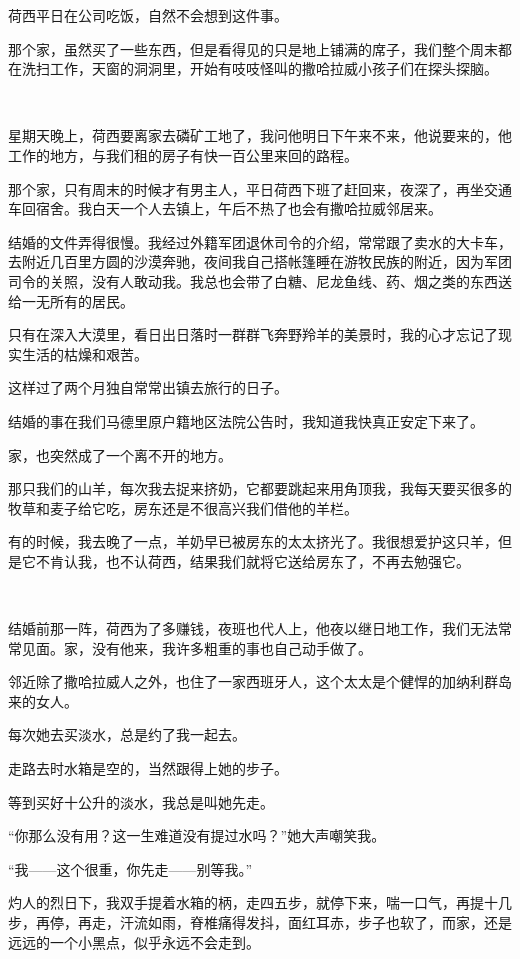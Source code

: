 \par 荷西平日在公司吃饭，自然不会想到这件事。
\par 那个家，虽然买了一些东西，但是看得见的只是地上铺满的席子，我们整个周末都在洗扫工作，天窗的洞洞里，开始有吱吱怪叫的撒哈拉威小孩子们在探头探脑。
\par  
\par 星期天晚上，荷西要离家去磷矿工地了，我问他明日下午来不来，他说要来的，他工作的地方，与我们租的房子有快一百公里来回的路程。
\par 那个家，只有周末的时候才有男主人，平日荷西下班了赶回来，夜深了，再坐交通车回宿舍。我白天一个人去镇上，午后不热了也会有撒哈拉威邻居来。
\par 结婚的文件弄得很慢。我经过外籍军团退休司令的介绍，常常跟了卖水的大卡车，去附近几百里方圆的沙漠奔驰，夜间我自己搭帐篷睡在游牧民族的附近，因为军团司令的关照，没有人敢动我。我总也会带了白糖、尼龙鱼线、药、烟之类的东西送给一无所有的居民。
\par 只有在深入大漠里，看日出日落时一群群飞奔野羚羊的美景时，我的心才忘记了现实生活的枯燥和艰苦。
\par 这样过了两个月独自常常出镇去旅行的日子。
\par 结婚的事在我们马德里原户籍地区法院公告时，我知道我快真正安定下来了。
\par 家，也突然成了一个离不开的地方。
\par 那只我们的山羊，每次我去捉来挤奶，它都要跳起来用角顶我，我每天要买很多的牧草和麦子给它吃，房东还是不很高兴我们借他的羊栏。
\par 有的时候，我去晚了一点，羊奶早已被房东的太太挤光了。我很想爱护这只羊，但是它不肯认我，也不认荷西，结果我们就将它送给房东了，不再去勉强它。
\par  
\par 结婚前那一阵，荷西为了多赚钱，夜班也代人上，他夜以继日地工作，我们无法常常见面。家，没有他来，我许多粗重的事也自己动手做了。
\par 邻近除了撒哈拉威人之外，也住了一家西班牙人，这个太太是个健悍的加纳利群岛来的女人。
\par 每次她去买淡水，总是约了我一起去。
\par 走路去时水箱是空的，当然跟得上她的步子。
\par 等到买好十公升的淡水，我总是叫她先走。
\par “你那么没有用？这一生难道没有提过水吗？”她大声嘲笑我。
\par “我——这个很重，你先走——别等我。”
\par 灼人的烈日下，我双手提着水箱的柄，走四五步，就停下来，喘一口气，再提十几步，再停，再走，汗流如雨，脊椎痛得发抖，面红耳赤，步子也软了，而家，还是远远的一个小黑点，似乎永远不会走到。
